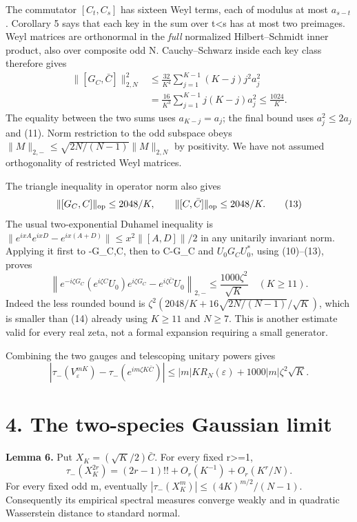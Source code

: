 \documentclass[11pt,a4paper]{article}
\begin{document}
The commutator \([C_t,C_s]\) has sixteen Weyl terms, each of modulus at most \(a_{s-t}\). Corollary 5 says that each key in the sum over t\textless s has at most two preimages. Weyl matrices are orthonormal in the \emph{full} normalized Hilbert--Schmidt inner product, also over composite odd N. Cauchy--Schwarz inside each key class therefore gives \[
 \begin{split}
 \|[G_C,\bar C]\|_{2,N}^2
 &\leq\frac{32}{K^4}\sum_{j=1}^{K-1}(K-j)j^2a_j^2\\
 &=\frac{16}{K^3}\sum_{j=1}^{K-1}j(K-j)a_j^2
 \leq\frac{1024}{K}.
 \end{split}                                                    \tag{12}
\] The equality between the two sums uses \(a_{K-j}=a_j\); the final bound uses \(a_j^2\leq2a_j\) and (11). Norm restriction to the odd subspace obeys \(\|M\|_{2,-}\leq\sqrt{2N/(N-1)}\|M\|_{2,N}\) by positivity. We have not assumed orthogonality of restricted Weyl matrices.

The triangle inequality in operator norm also gives \[
 \|[G_C,C]\|_{\rm op}\leq2048/K,\qquad
 \|[C,\bar C]\|_{\rm op}\leq2048/K.                           \tag{13}
\] The usual two-exponential Duhamel inequality is \(\|e^{ixA}e^{ixD}-e^{ix(A+D)}\|\leq x^2\|[A,D]\|/2\) in any unitarily invariant norm. Applying it first to -G\_C,C, then to C-G\_C and \(U_0G_CU_0^*\), using (10)--(13), proves \[
 \left\|e^{-i\zeta G_C}(e^{i\zeta C}U_0)e^{i\zeta G_C}
                        -e^{i\zeta\bar C}U_0\right\|_{2,-}
 \leq\frac{1000\zeta^2}{\sqrt K}\quad(K\geq11).               \tag{14}
\] Indeed the less rounded bound is \(\zeta^2(2048/K+16\sqrt{2N/(N-1)}/\sqrt K)\), which is smaller than (14) already using \(K\geq11\) and \(N\geq7\). This is another estimate valid for every real zeta, not a formal expansion requiring a small generator.

Combining the two gauges and telescoping unitary powers gives \[
 \left|\tau_-(V_\varepsilon^{mK})-
          \tau_-(e^{im\zeta K\bar C})\right|
 \leq |m|KR_N(\varepsilon)+1000|m|\zeta^2\sqrt K.              \tag{15}
\]

\hypertarget{the-two-species-gaussian-limit}{%
\section{4. The two-species Gaussian limit}\label{the-two-species-gaussian-limit}}

\textbf{Lemma 6.} Put \(X_K=(\sqrt K/2)\bar C\). For every fixed r\textgreater=1, \[
 \tau_-(X_K^{2r})=(2r-1)!!+O_r(K^{-1})+O_r(K^r/N).             \tag{16}
\] For every fixed odd m, eventually \(|\tau_-(X_K^m)|\leq(4K)^{m/2}/(N-1)\). Consequently its empirical spectral measures converge weakly and in quadratic Wasserstein distance to standard normal.
\end{document}

